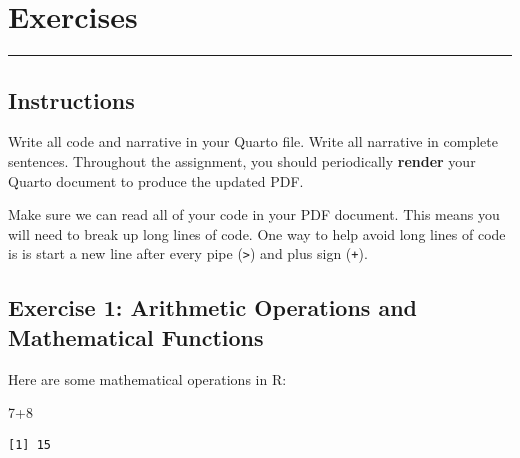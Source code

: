 \documentclass[
  letterpaper,
  DIV=11,
  numbers=noendperiod]{scrartcl}
\newenvironment{Shaded}{\begin{snugshade}}{\end{snugshade}}
\newcommand{\DecValTok}[1]{\textcolor[rgb]{0.68,0.00,0.00}{#1}}
\newcommand{\SpecialCharTok}[1]{\textcolor[rgb]{0.37,0.37,0.37}{#1}}
\begin{document}
\section{Exercises}\label{exercises}

\begin{center}\rule{0.5\linewidth}{0.5pt}\end{center}

\subsection{Instructions}\label{instructions}

Write all code and narrative in your Quarto file. Write all narrative in
complete sentences. Throughout the assignment, you should periodically
\textbf{render} your Quarto document to produce the updated PDF.

\begin{tcolorbox}[enhanced jigsaw, colframe=quarto-callout-tip-color-frame, opacitybacktitle=0.6, coltitle=black, colback=white, rightrule=.15mm, leftrule=.75mm, opacityback=0, left=2mm, colbacktitle=quarto-callout-tip-color!10!white, breakable, toptitle=1mm, bottomtitle=1mm, titlerule=0mm, bottomrule=.15mm, toprule=.15mm, arc=.35mm, title=\textcolor{quarto-callout-tip-color}{\faLightbulb}\hspace{0.5em}{Tip}]

Make sure we can read all of your code in your PDF document. This means
you will need to break up long lines of code. One way to help avoid long
lines of code is is start a new line after every pipe
(\texttt{\textbar{}\textgreater{}}) and plus sign (\texttt{+}).

\end{tcolorbox}

\subsection{Exercise 1: Arithmetic Operations and Mathematical
Functions}\label{exercise-1-arithmetic-operations-and-mathematical-functions}

Here are some mathematical operations in R:

\begin{Shaded}
\begin{Highlighting}[]
\DecValTok{7}\SpecialCharTok{+}\DecValTok{8}
\end{Highlighting}
\end{Shaded}

\begin{verbatim}
[1] 15
\end{verbatim}
\end{document}
